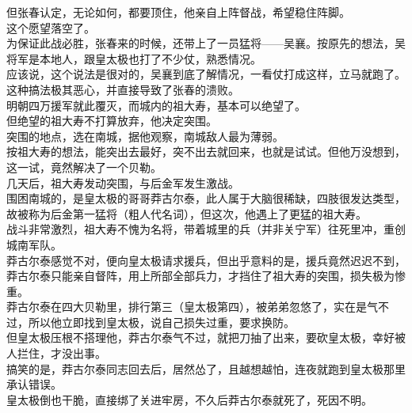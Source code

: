 \begin{multicols}{\theparacolNo}
但张春认定，无论如何，都要顶住，他亲自上阵督战，希望稳住阵脚。\\

这个愿望落空了。\\

为保证此战必胜，张春来的时候，还带上了一员猛将——吴襄。按原先的想法，吴将军是本地人，跟皇太极也打了不少仗，熟悉情况。\\

应该说，这个说法是很对的，吴襄到底了解情况，一看仗打成这样，立马就跑了。\\

这种搞法极其恶心，并直接导致了张春的溃败。\\

明朝四万援军就此覆灭，而城内的祖大寿，基本可以绝望了。\\

但绝望的祖大寿不打算放弃，他决定突围。\\

突围的地点，选在南城，据他观察，南城敌人最为薄弱。\\

按祖大寿的想法，能突出去最好，突不出去就回来，也就是试试。但他万没想到，这一试，竟然解决了一个贝勒。\\

几天后，祖大寿发动突围，与后金军发生激战。\\

围困南城的，是皇太极的哥哥莽古尔泰，此人属于大脑很稀缺，四肢很发达类型，故被称为后金第一猛将（粗人代名词），但这次，他遇上了更猛的祖大寿。\\

战斗非常激烈，祖大寿不愧为名将，带着城里的兵（并非关宁军）往死里冲，重创城南军队。\\

莽古尔泰感觉不对，便向皇太极请求援兵，但出乎意料的是，援兵竟然迟迟不到，莽古尔泰只能亲自督阵，用上所部全部兵力，才挡住了祖大寿的突围，损失极为惨重。\\

莽古尔泰在四大贝勒里，排行第三（皇太极第四），被弟弟忽悠了，实在是气不过，所以他立即找到皇太极，说自己损失过重，要求换防。\\

但皇太极压根不搭理他，莽古尔泰气不过，就把刀抽了出来，要砍皇太极，幸好被人拦住，才没出事。\\

搞笑的是，莽古尔泰同志回去后，居然怂了，且越想越怕，连夜就跑到皇太极那里承认错误。\\

皇太极倒也干脆，直接绑了关进牢房，不久后莽古尔泰就死了，死因不明。\\


\end{multicols}

